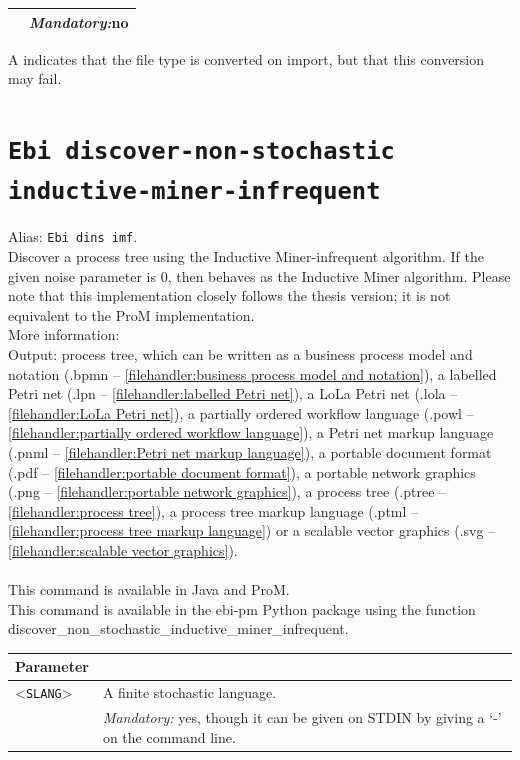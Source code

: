 {\begin{tabularx}{\linewidth}{lX}
&\textit{Mandatory:}\quad no\\
\bottomrule
\end{tabularx}
A \textdagger{} indicates that the file type is converted on import, but that this conversion may fail.
\clearpage\section{\texttt{Ebi discover-non-stochastic inductive-miner-infrequent}}
\label{command:Ebi discover-non-stochastic inductive-miner-infrequent}
Alias: \texttt{Ebi dins imf}.\\
Discover a process tree using the Inductive Miner-infrequent algorithm. 
    If the given noise parameter is 0, then behaves as the Inductive Miner algorithm.
    Please note that this implementation closely follows the thesis version; it is not equivalent to the ProM implementation.\\
More information: \cite{DBLP:series/lnbip/Leemans22}~\\
\noindent Output: process tree, which can be written as a business process model and notation (.bpmn -- \cref{filehandler:business process model and notation}), a labelled Petri net (.lpn -- \cref{filehandler:labelled Petri net}), a LoLa Petri net (.lola -- \cref{filehandler:LoLa Petri net}), a partially ordered workflow language (.powl -- \cref{filehandler:partially ordered workflow language}), a Petri net markup language (.pnml -- \cref{filehandler:Petri net markup language}), a portable document format (.pdf -- \cref{filehandler:portable document format}), a portable network graphics (.png -- \cref{filehandler:portable network graphics}), a process tree (.ptree -- \cref{filehandler:process tree}), a process tree markup language (.ptml -- \cref{filehandler:process tree markup language}) or a scalable vector graphics (.svg -- \cref{filehandler:scalable vector graphics}).\\
\\This command is available in Java and ProM.
\\This command is available in the ebi-pm Python package using the function discover\_non\_stochastic\_inductive\_miner\_infrequent.
\begin{tabularx}{\linewidth}{lX}
\toprule
Parameter \\\midrule
<\texttt{SLANG}>&A finite stochastic language.\\
&\textit{Mandatory:} \quad yes, though it can be given on STDIN by giving a `-' on the command line.\\

\end{tabularx}}
